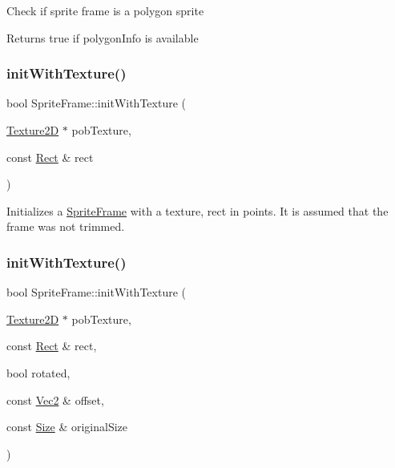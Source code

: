 Check if sprite frame is a polygon sprite

\begin{DoxyReturn}{Returns}
true if polygon\+Info is available 
\end{DoxyReturn}
\mbox{\label{classSpriteFrame_ab6f82a9d511a1aeb016621dabda96669}} 
\subsubsection{\texorpdfstring{init\+With\+Texture()}{initWithTexture()}\hspace{0.1cm}{\footnotesize\ttfamily [1/4]}}
{\footnotesize\ttfamily bool Sprite\+Frame\+::init\+With\+Texture (\begin{DoxyParamCaption}\item[{\hyperlink{classTexture2D}{Texture2D} $\ast$}]{pob\+Texture,  }\item[{const \hyperlink{classRect}{Rect} \&}]{rect }\end{DoxyParamCaption})}

Initializes a \hyperlink{classSpriteFrame}{Sprite\+Frame} with a texture, rect in points. It is assumed that the frame was not trimmed. \mbox{\label{classSpriteFrame_a34c705b9057c0fac4d6697a235c67df8}} 
\subsubsection{\texorpdfstring{init\+With\+Texture()}{initWithTexture()}\hspace{0.1cm}{\footnotesize\ttfamily [2/4]}}
{\footnotesize\ttfamily bool Sprite\+Frame\+::init\+With\+Texture (\begin{DoxyParamCaption}\item[{\hyperlink{classTexture2D}{Texture2D} $\ast$}]{pob\+Texture,  }\item[{const \hyperlink{classRect}{Rect} \&}]{rect,  }\item[{bool}]{rotated,  }\item[{const \hyperlink{classVec2}{Vec2} \&}]{offset,  }\item[{const \hyperlink{classSize}{Size} \&}]{original\+Size }\end{DoxyParamCaption})}

